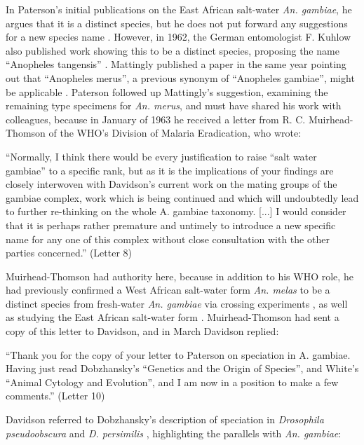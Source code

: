 \documentclass[a4paper,11pt,abstracton,hidelinks]{scrartcl}
\begin{document}
In Paterson's initial publications on the East African salt-water \textit{An. gambiae}, he argues that it is a distinct species, but he does not put forward any suggestions for a new species name \citep{Paterson1962a,Paterson1962b}. 
However, in 1962, the German entomologist F. Kuhlow also published work showing this to be a distinct species, proposing the name ``Anopheles tangensis'' \citep{Kuhlow1962}. 
Mattingly published a paper in the same year pointing out that ``Anopheles merus'', a previous synonym of ``Anopheles gambiae'', might be applicable \citep{Mattingly1962}. 
Paterson followed up Mattingly's suggestion, examining the remaining type specimens for \textit{An. merus}, and must have shared his work with colleagues, because in January of 1963 he received a letter from R. C. Muirhead-Thomson of the WHO's Division of Malaria Eradication, who wrote:

\begin{displayquote}
``Normally, I think there would be every justification to raise ``salt water gambiae'' to a specific rank, but as it is the implications of your findings are closely interwoven with Davidson's current work on the mating groups of the gambiae complex, work which is being continued and which will undoubtedly lead to further re-thinking on the whole A. gambiae taxonomy. [...] I would consider that it is perhaps rather premature and untimely to introduce a new specific name for any one of this complex without close consultation with the other parties concerned.'' (Letter 8)
\end{displayquote}

Muirhead-Thomson had authority here, because in addition to his WHO role, he had previously confirmed a West African salt-water form \textit{An. melas} to be a distinct species from fresh-water \textit{An. gambiae} via crossing experiments \citep{MuirheadThomson1948}, as well as studying the East African salt-water form \citep{MuirheadThomson1951}. Muirhead-Thomson had sent a copy of this letter to Davidson, and in March Davidson replied:

\begin{displayquote}
``Thank you for the copy of your letter to Paterson on speciation in A. gambiae. Having just read Dobzhansky's ``Genetics and the Origin of Species'', and White's ``Animal Cytology and Evolution'', and I am now in a position to make a few comments.'' (Letter 10)
\end{displayquote}

Davidson referred to Dobzhansky's description of speciation in \textit{Drosophila pseudoobscura} and \textit{D. persimilis} \citep{Dobzhansky1951}, highlighting the parallels with \textit{An. gambiae}:
\end{document}
